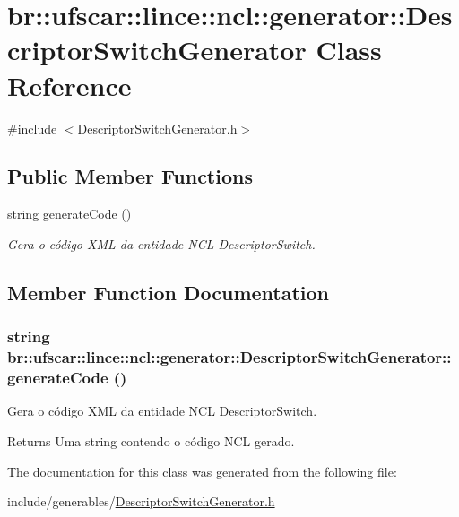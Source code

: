 \hypertarget{classbr_1_1ufscar_1_1lince_1_1ncl_1_1generator_1_1DescriptorSwitchGenerator}{
\section{br::ufscar::lince::ncl::generator::DescriptorSwitchGenerator Class Reference}
\label{classbr_1_1ufscar_1_1lince_1_1ncl_1_1generator_1_1DescriptorSwitchGenerator}
}


{\ttfamily \#include $<$DescriptorSwitchGenerator.h$>$}

\subsection*{Public Member Functions}
\begin{DoxyCompactItemize}
\item 
string \hyperlink{classbr_1_1ufscar_1_1lince_1_1ncl_1_1generator_1_1DescriptorSwitchGenerator_a0ac98c29f1937f7b04f26c745c690abd}{generateCode} ()
\begin{DoxyCompactList}\small\item\em Gera o código XML da entidade NCL DescriptorSwitch. \item\end{DoxyCompactList}\end{DoxyCompactItemize}


\subsection{Member Function Documentation}
\hypertarget{classbr_1_1ufscar_1_1lince_1_1ncl_1_1generator_1_1DescriptorSwitchGenerator_a0ac98c29f1937f7b04f26c745c690abd}{
\subsubsection[{generateCode}]{\setlength{\rightskip}{0pt plus 5cm}string br::ufscar::lince::ncl::generator::DescriptorSwitchGenerator::generateCode ()}}
\label{classbr_1_1ufscar_1_1lince_1_1ncl_1_1generator_1_1DescriptorSwitchGenerator_a0ac98c29f1937f7b04f26c745c690abd}


Gera o código XML da entidade NCL DescriptorSwitch. 

\begin{DoxyReturn}{Returns}
Uma string contendo o código NCL gerado. 
\end{DoxyReturn}


The documentation for this class was generated from the following file:\begin{DoxyCompactItemize}
\item 
include/generables/\hyperlink{DescriptorSwitchGenerator_8h}{DescriptorSwitchGenerator.h}\end{DoxyCompactItemize}
